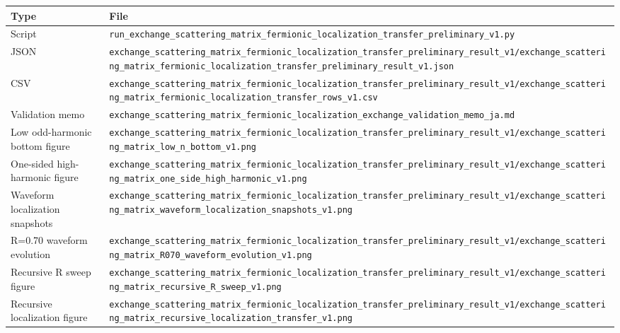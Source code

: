 \documentclass[
]{article}
\newcounter{none} %
\begin{document}
{\def\LTcaptype{none} %
\begin{longtable}[]{@{}
  >{\raggedright\arraybackslash}p{}
  >{\raggedright\arraybackslash}p{}@{}}
\toprule\noalign{}
\begin{minipage}[b]{\linewidth}\raggedright
Type
\end{minipage} & \begin{minipage}[b]{\linewidth}\raggedright
File
\end{minipage} \\
\midrule\noalign{}
\endhead
\bottomrule\noalign{}
\endlastfoot
Script &
\texttt{run\_exchange\_scattering\_matrix\_fermionic\_localization\_transfer\_preliminary\_v1.py} \\
JSON &
\texttt{exchange\_scattering\_matrix\_fermionic\_localization\_transfer\_preliminary\_result\_v1/exchange\_scattering\_matrix\_fermionic\_localization\_transfer\_preliminary\_result\_v1.json} \\
CSV &
\texttt{exchange\_scattering\_matrix\_fermionic\_localization\_transfer\_preliminary\_result\_v1/exchange\_scattering\_matrix\_fermionic\_localization\_transfer\_rows\_v1.csv} \\
Validation memo &
\texttt{exchange\_scattering\_matrix\_fermionic\_localization\_exchange\_validation\_memo\_ja.md} \\
Low odd-harmonic bottom figure &
\texttt{exchange\_scattering\_matrix\_fermionic\_localization\_transfer\_preliminary\_result\_v1/exchange\_scattering\_matrix\_low\_n\_bottom\_v1.png} \\
One-sided high-harmonic figure &
\texttt{exchange\_scattering\_matrix\_fermionic\_localization\_transfer\_preliminary\_result\_v1/exchange\_scattering\_matrix\_one\_side\_high\_harmonic\_v1.png} \\
Waveform localization snapshots &
\texttt{exchange\_scattering\_matrix\_fermionic\_localization\_transfer\_preliminary\_result\_v1/exchange\_scattering\_matrix\_waveform\_localization\_snapshots\_v1.png} \\
R=0.70 waveform evolution &
\texttt{exchange\_scattering\_matrix\_fermionic\_localization\_transfer\_preliminary\_result\_v1/exchange\_scattering\_matrix\_R070\_waveform\_evolution\_v1.png} \\
Recursive R sweep figure &
\texttt{exchange\_scattering\_matrix\_fermionic\_localization\_transfer\_preliminary\_result\_v1/exchange\_scattering\_matrix\_recursive\_R\_sweep\_v1.png} \\
Recursive localization figure &
\texttt{exchange\_scattering\_matrix\_fermionic\_localization\_transfer\_preliminary\_result\_v1/exchange\_scattering\_matrix\_recursive\_localization\_transfer\_v1.png} \\
\end{longtable}
}
\end{document}

